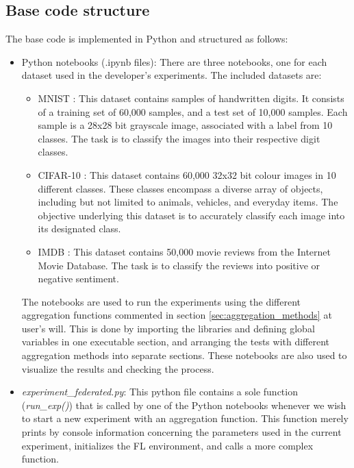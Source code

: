 \subsection{Base code structure} \label{sec:base_code}
The base code is implemented in Python and structured as follows:
\begin{itemize}
        \item Python notebooks (.ipynb files): There are three notebooks, one for each dataset used in the developer's experiments. The included datasets are:
        \begin{itemize}
                \item MNIST \cite{MNIST}: This dataset contains samples of handwritten digits. It consists of a training set of 60,000 samples, and a test set of 10,000 samples. Each sample is a 28x28 bit grayscale image, associated with a label from 10 classes. The task is to classify the images into their respective digit classes.
                \item CIFAR-10 \cite{CIFAR10}: This dataset contains 60,000 32x32 bit colour images in 10 different classes. These classes encompass a diverse array of objects, including but not limited to animals, vehicles, and everyday items. The objective underlying this dataset is to accurately classify each image into its designated class.
                \item IMDB \cite{IMDB}: This dataset contains 50,000 movie reviews from the Internet Movie Database. The task is to classify the reviews into positive or negative sentiment.
        \end{itemize}
        The notebooks are used to run the experiments using the different aggregation functions commented in section \ref{sec:aggregation_methods} at user's will. This is done by importing the libraries and defining global variables in one executable section, and arranging the tests with different aggregation methods into separate sections. These notebooks are also used to visualize the results and checking the process.
        \item \textit{experiment\_federated.py}: This python file contains a sole function (\textit{run\_exp()}) that is called by one of the Python notebooks whenever we wish to start a new experiment with an aggregation function. This function merely prints by console information concerning the parameters used in the current experiment, initializes the FL environment, and calls a more complex function.

\end{itemize}
